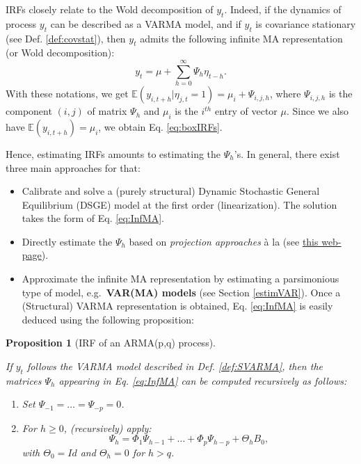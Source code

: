 \documentclass[
  12pt,
]{book}
\providecommand{\tightlist}{%
  \setlength{\itemsep}{0pt}\setlength{\parskip}{0pt}}
\newtheorem{proposition}{Proposition}[chapter]
\theoremstyle{definition}
\theoremstyle{definition}
\theoremstyle{definition}
\theoremstyle{definition}
\theoremstyle{remark}
\begin{document}
IRFs closely relate to the Wold decomposition of \(y_t\). Indeed, if the dynamics of process \(y_t\) can be described as a VARMA model, and if \(y_t\) is covariance stationary (see Def. \ref{def:covstat}), then \(y_t\) admits the following infinite MA representation (or Wold decomposition):
\begin{equation}
y_t = \mu + \sum_{h=0}^\infty \Psi_{h} \eta_{t-h}.\label{eq:InfMA}
\end{equation}
With these notations, we get \(\mathbb{E}(y_{i,t+h}|\eta_{j,t}=1) = \mu_i + \Psi_{i,j,h}\), where \(\Psi_{i,j,h}\) is the component \((i,j)\) of matrix \(\Psi_h\) and \(\mu_i\) is the \(i^{th}\) entry of vector \(\mu\). Since we also have \(\mathbb{E}(y_{i,t+h})=\mu_i\), we obtain Eq. \eqref{eq:boxIRFs}.

Hence, estimating IRFs amounts to estimating the \(\Psi_{h}\)'s. In general, there exist three main approaches for that:

\begin{itemize}
\tightlist
\item
  Calibrate and solve a (purely structural) Dynamic Stochastic General Equilibrium (DSGE) model at the first order (linearization). The solution takes the form of Eq. \eqref{eq:InfMA}.
\item
  Directly estimate the \(\Psi_{h}\) based on \emph{projection approaches} à la \citet{Jorda_2005} (see \href{https://jrenne.github.io/IdentifStructShocks/Projections.html}{this web-page}).
\item
  Approximate the infinite MA representation by estimating a parsimonious type of model, e.g.~\textbf{VAR(MA) models} (see Section \ref{estimVAR}). Once a (Structural) VARMA representation is obtained, Eq. \eqref{eq:InfMA} is easily deduced using the following proposition:
\end{itemize}

\begin{proposition}[IRF of an ARMA(p,q) process]
\protect\hypertarget{prp:computPsi}{}\label{prp:computPsi}

If \(y_t\) follows the VARMA model described in Def. \ref{def:SVARMA}, then the matrices \(\Psi_h\) appearing in Eq. \eqref{eq:InfMA} can be computed recursively as follows:

\begin{enumerate}
\def\labelenumi{\arabic{enumi}.}
\tightlist
\item
  Set \(\Psi_{-1}=\dots=\Psi_{-p}=0\).
\item
  For \(h \ge 0\), (recursively) apply:
  \[
  \Psi_h = \Phi_1 \Psi_{h-1} + \dots + \Phi_p \Psi_{h-p} + \Theta_h B_0,
  \]
  with \(\Theta_0 = Id\) and \(\Theta_h = 0\) for \(h>q\).
\end{enumerate}

\end{proposition}
\end{document}
